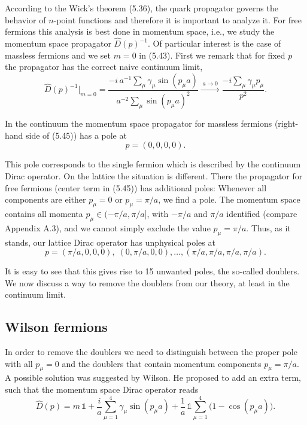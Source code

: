 According to the Wick's theorem (5.36), the quark propagator governs the
behavior of $n$-point functions and therefore it is important to analyze it. For
free fermions this analysis is best done in momentum space, i.e., we study
the momentum space propagator $\hat{D}(p)^{-1}$. Of particular interest is the case of
massless fermions and we set $m = 0$ in (5.43). First we remark that for fixed
$p$ the propagator has the correct naive continuum limit,
\begin{equation}
  \hat{D}(p)^{-1}\Big|_{m=0}
  = \frac{-i\,a^{-1}\sum_\mu\gamma_\mu\sin(p_\mu a)}
         {a^{-2}\sum_\mu\sin(p_\mu a)^2}
  \xrightarrow{\;a\to 0\;}
  \frac{-i\sum_\mu\gamma_\mu p_\mu}{p^2} .
\end{equation}

In the continuum the momentum space propagator for massless fermions
(right-hand side of (5.45)) has a pole at
\begin{equation}
  p = (0, 0, 0, 0) .
\end{equation}

This pole corresponds to the single fermion which is described by the continuum Dirac operator. On the lattice the situation is different. There the propagator for free fermions (center term in (5.45)) has additional poles: Whenever
all components are either $p_\mu = 0$ or $p_\mu = \pi/a$, we find a pole. The momentum
space contains all momenta $p_\mu \in (-\pi/a, \pi/a]$, with $-\pi/a$ and $\pi/a$ identified
(compare Appendix A.3), and we cannot simply exclude the value $p_\mu = \pi/a$.
Thus, as it stands, our lattice Dirac operator has unphysical poles at
\begin{equation}
  p = (\pi/a, 0, 0, 0), \;(0, \pi/a, 0, 0), \ldots, (\pi/a, \pi/a, \pi/a, \pi/a) .
\end{equation}

It is easy to see that this gives rise to 15 unwanted poles, the so-called doublers.
We now discuss a way to remove the doublers from our theory, at least in the
continuum limit.

\subsection{Wilson fermions}

In order to remove the doublers we need to distinguish between the proper
pole with all $p_\mu = 0$ and the doublers that contain momentum components
$p_\mu = \pi/a$. A possible solution was suggested by Wilson. He proposed to add
an extra term, such that the momentum space Dirac operator reads
\begin{equation}
  \hat{D}(p) = m\,\mathbb{1} + \frac{i}{a}\sum_{\mu=1}^{4}\gamma_\mu\sin(p_\mu a)
    + \frac{1}{a}\,\mathbb{1}\sum_{\mu=1}^{4}\big(1 - \cos(p_\mu a)\big) .
\end{equation}

